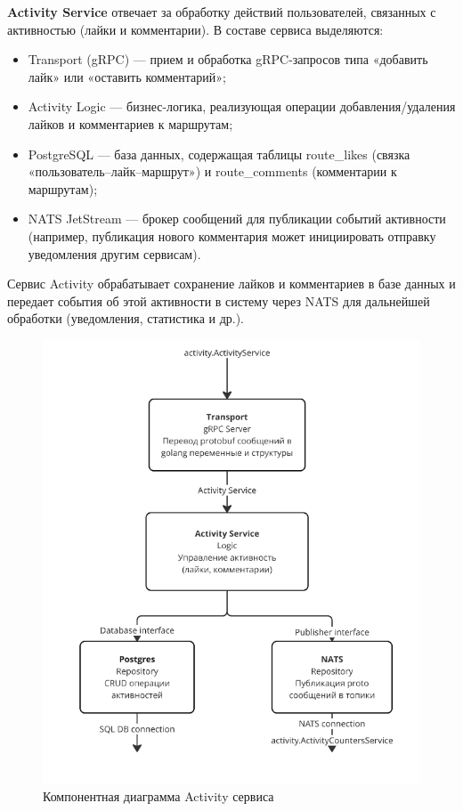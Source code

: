 \textbf{Activity Service} отвечает за обработку действий пользователей, связанных с активностью (лайки и комментарии). В составе сервиса выделяются:
\begin{itemize}
    \item Transport (gRPC) — прием и обработка gRPC-запросов типа «добавить лайк» или «оставить комментарий»;
    \item Activity Logic — бизнес-логика, реализующая операции добавления/удаления лайков и комментариев к маршрутам;
    \item PostgreSQL — база данных, содержащая таблицы route\_likes (связка «пользователь–лайк–маршрут») и route\_comments (комментарии к маршрутам);
    \item NATS JetStream — брокер сообщений для публикации событий активности (например, публикация нового комментария может инициировать отправку уведомления другим сервисам).
\end{itemize}
\noindent Сервис Activity обрабатывает сохранение лайков и комментариев в базе данных и передает события об этой активности в систему через NATS для дальнейшей обработки (уведомления, статистика и др.).
\begin{figure}[H]
        \centering
        \includegraphics[width=0.8\linewidth]{Images/second_chapter_backend_architecture/Picture5.png}
        \caption{Компонентная диаграмма Activity сервиса}
        \label{fig:activity-service-component-diagram}
\end{figure}

